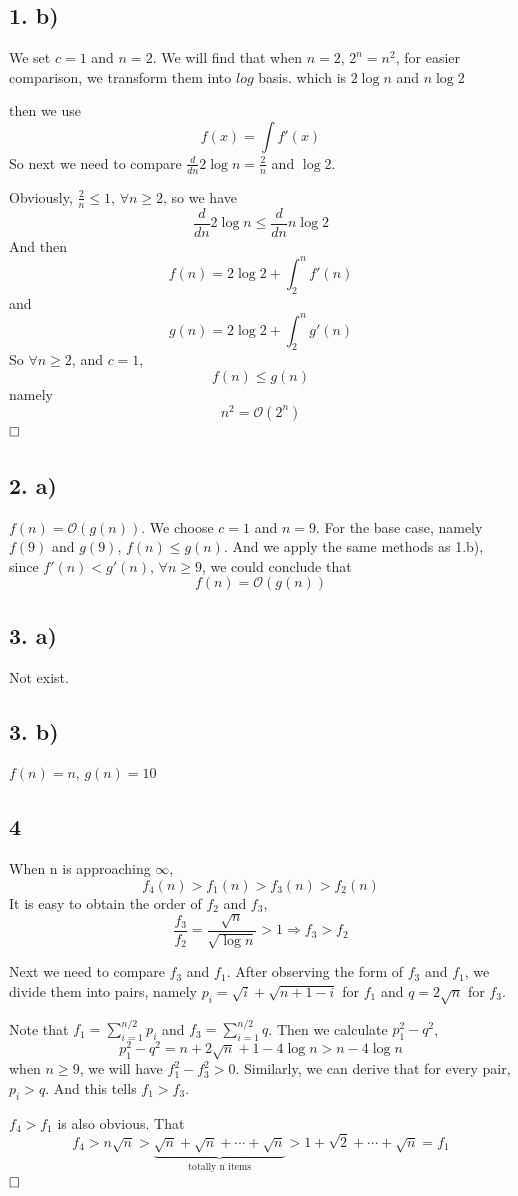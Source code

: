 \documentclass[A4paper]{article}
\newcommand{\qedhere}{$\hfill\ensuremath{\square}$}
\begin{document}
\subsection*{1. b)}
We set $c = 1$ and $n = 2$. We will find that when $n=2$, $2^n = n^2$, for easier comparison, we transform them into $log$ basis. which is $2\log n$ and $n \log 2$
\par then we use 
\[
	f(x) = \int f'(x)
\]
So next we need to compare $\frac{d}{dn} 2 \log n = \frac{2}{n}$ and $\log 2$.\par  Obviously, $\frac{2}{n}\leq 1$, $\forall n \geq 2$, so we have \[
	\frac{d}{dn} 2 \log n \leq \frac{d}{dn} n \log 2
\]
And then 
\[
	f(n) = 2 \log 2 + \int_{2}^n f'(n)
\]
and \[
	g(n) = 2\log 2 + \int_2^n g'(n)
\]
So  $\forall 	n\geq 2$, and $c =1$, \[
	f(n) \leq g(n)
\]
namely
\[
	n^2 = \mathcal{O}(2^n)
\]
\qedhere
\subsection*{2. a)}
$f(n) = \mathcal{O}(g(n))$. We choose $c = 1$ and $n = 9$. For the base case, namely $f(9)$ and $g(9)$, $f(n) \leq g(n)$. And we apply the same methods as 1.b), since $f'(n)<g'(n)$, $\forall n \geq 9$, we could conclude that 
\[
f(n) = \mathcal{O}(g(n))
\] 
\subsection*{3. a)}
Not exist.
\subsection*{3. b)}
$f(n) = n$, $g(n) = 10$ 
\subsection*{4}
When n is approaching $\infty$,
\[
	f_4(n) > f_1(n) > f_3(n) > f_2(n)
\]
It is easy to obtain the order of $f_2$ and $f_3$, \[
	\frac{f_3}{f_2} = \frac{\sqrt{n}}{\sqrt{\log n}} >1 \Rightarrow  f_3 > f_2
\]
\par Next we need to compare $f_3$ and $f_1$. After observing the form of $f_3$ and $f_1$, we divide them into pairs, namely $p_i= \sqrt{i}+\sqrt{n+1-i}$ for $f_1$ and $q = 2 \sqrt{n}$ for $f_3$.
\par Note that $f_1 = \sum_{i=1}^{n/2} p_i$ and $f_3 = \sum_{i=1}^{n/2} q $.
Then we calculate $p_1^2-q^2$,
\[
	p_1^2-q^2 = n+ 2\sqrt{n}+1 - 4 \log n > n - 4\log n
\]
when $n\geq 9$, we will have $f_1^2-f_3^2>0$. Similarly, we can derive that for every pair, $p_i > q$. And this tells $f_1>f_3$.
\par $f_4>f_1$ is also obvious. That 
\[
	f_4 > n \sqrt{n} > \underbrace{\sqrt{n} + \sqrt{n} + \cdots + \sqrt{n}}_{\text{totally n items}} > 1 + \sqrt{2} + \cdots + \sqrt{n} = f_1
\]
\qedhere
\end{document}

